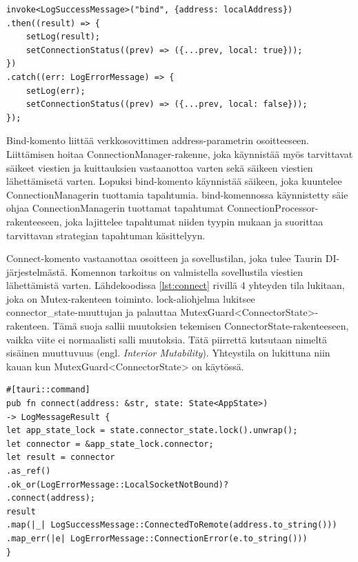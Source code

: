 \documentclass[a4paper,12pt]{article}
\begin{document}
    \begin{lstlisting}[caption={bind-komennon kutsuminen.}, label={lst:calling_bind}]
invoke<LogSuccessMessage>("bind", {address: localAddress})
.then((result) => {
    setLog(result);
    setConnectionStatus((prev) => ({...prev, local: true}));
})
.catch((err: LogErrorMessage) => {
    setLog(err);
    setConnectionStatus((prev) => ({...prev, local: false}));
});\end{lstlisting}

    Bind-komento liittää verkkosovittimen address-parametrin osoitteeseen. Liittämisen hoitaa ConnectionManager-rakenne, joka käynnistää myös tarvittavat säikeet viestien ja kuittauksien vastaanottoa varten sekä säikeen viestien lähettämisetä varten. Lopuksi bind-komento käynnistää säikeen, joka kuuntelee\\ ConnectionManagerin tuottamia tapahtumia.
    bind-komennossa käynnistetty säie ohjaa ConnectionManagerin tuottamat tapahtumat ConnectionProcessor-rakenteeseen, joka lajittelee tapahtumat niiden tyypin mukaan ja suorittaa tarvittavan strategian tapahtuman käsittelyyn.\par

    Connect-komento vastaanottaa osoitteen ja sovellustilan, joka tulee Taurin DI-järjestelmästä. Komennon tarkoitus on valmistella sovellustila viestien lähettämistä varten. Lähdekoodissa \ref{lst:connect} rivillä 4 yhteyden tila lukitaan, joka on Mutex-rakenteen toiminto. lock-aliohjelma lukitsee \\ connector\_state-muuttujan ja palauttaa MutexGuard<ConnectorState>-rakenteen. Tämä suoja sallii muutoksien tekemisen ConnectorState-rakenteeseen, vaikka viite ei normaalisti salli muutoksia. Tätä piirrettä kutsutaan nimeltä sisäinen muuttuvuus (engl.  \textit{Interior Mutability}). Yhteystila on lukittuna niin kauan kun MutexGuard<ConnectorState> on käytössä.\par

    \begin{lstlisting}[basicstyle=\small\ttfamily,caption={connect-komento.}, label={lst:connect}]
#[tauri::command]
pub fn connect(address: &str, state: State<AppState>)
-> LogMessageResult {
let app_state_lock = state.connector_state.lock().unwrap();
let connector = &app_state_lock.connector;
let result = connector
.as_ref()
.ok_or(LogErrorMessage::LocalSocketNotBound)?
.connect(address);
result
.map(|_| LogSuccessMessage::ConnectedToRemote(address.to_string()))
.map_err(|e| LogErrorMessage::ConnectionError(e.to_string()))
}\end{lstlisting}
\end{document}
